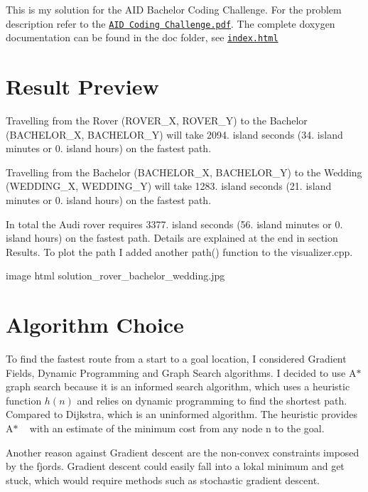 This is my solution for the A\+ID Bachelor Coding Challenge. For the problem description refer to the \href{AID_Coding_Challenge.pdf}{\tt A\+ID Coding Challenge.\+pdf}. The complete doxygen documentation can be found in the doc folder, see \href{doc/html/index.html}{\tt index.\+html}

\section*{Result Preview}

Travelling from the Rover (R\+O\+V\+E\+R\+\_\+X, R\+O\+V\+E\+R\+\_\+Y) to the Bachelor (B\+A\+C\+H\+E\+L\+O\+R\+\_\+X, B\+A\+C\+H\+E\+L\+O\+R\+\_\+Y) will take 2094. island seconds (34. island minutes or 0. island hours) on the fastest path.

Travelling from the Bachelor (B\+A\+C\+H\+E\+L\+O\+R\+\_\+X, B\+A\+C\+H\+E\+L\+O\+R\+\_\+Y) to the Wedding (W\+E\+D\+D\+I\+N\+G\+\_\+X, W\+E\+D\+D\+I\+N\+G\+\_\+Y) will take 1283. island seconds (21. island minutes or 0. island hours) on the fastest path.

In total the Audi rover requires 3377. island seconds (56. island minutes or 0. island hours) on the fastest path. Details are explained at the end in section Results. To plot the path I added another path() function to the visualizer.\+cpp.

image html solution\+\_\+rover\+\_\+bachelor\+\_\+wedding.\+jpg





\section*{Algorithm Choice}

To find the fastest route from a start to a goal location, I considered Gradient Fields, Dynamic Programming and Graph Search algorithms. I decided to use A$\ast$ graph search because it is an informed search algorithm, which uses a heuristic function $h(n)$ and relies on dynamic programming to find the shortest path. Compared to Dijkstra, which is an uninformed algorithm. The heuristic provides A$\ast$ ~\newline
 with an estimate of the minimum cost from any node n to the goal.

Another reason against Gradient descent are the non-\/convex constraints imposed by the fjords. Gradient descent could easily fall into a lokal minimum and get stuck, which would require methods such as stochastic gradient descent.

